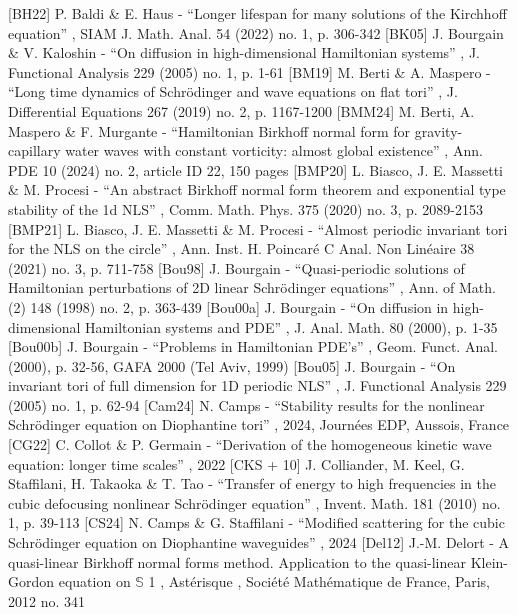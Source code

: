  [BH22] P. Baldi \& E. Haus - “Longer lifespan for many solutions of the Kirchhoff equation” , SIAM J. Math. Anal. 54 (2022) no. 1, p. 306-342
 [BK05] J. Bourgain \& V. Kaloshin - “On diffusion in high-dimensional Hamiltonian systems” , J. Functional Analysis 229 (2005) no. 1, p. 1-61
 [BM19] M. Berti \& A. Maspero - “Long time dynamics of Schrödinger and wave equations on flat tori” , J. Differential Equations 267 (2019) no. 2, p. 1167-1200
 [BMM24] M. Berti, A. Maspero \& F. Murgante - “Hamiltonian Birkhoff normal form for gravity-capillary water waves with constant vorticity: almost global existence” , Ann. PDE 10 (2024) no. 2, article ID 22, 150 pages
 [BMP20] L. Biasco, J. E. Massetti \& M. Procesi - “An abstract Birkhoff normal form theorem and exponential type stability of the 1d NLS” , Comm. Math. Phys. 375 (2020) no. 3, p. 2089-2153
 [BMP21] L. Biasco, J. E. Massetti \& M. Procesi - “Almost periodic invariant tori for the NLS on the circle” , Ann. Inst. H. Poincaré C Anal. Non Linéaire 38 (2021) no. 3, p. 711-758
 [Bou98] J. Bourgain - “Quasi-periodic solutions of Hamiltonian perturbations of 2D linear Schrödinger equations” , Ann. of Math. (2) 148 (1998) no. 2, p. 363-439
 [Bou00a] J. Bourgain - “On diffusion in high-dimensional Hamiltonian systems and PDE” , J. Anal. Math. 80 (2000), p. 1-35
 [Bou00b] J. Bourgain - “Problems in Hamiltonian PDE’s” , Geom. Funct. Anal. (2000), p. 32-56, GAFA 2000 (Tel Aviv, 1999)
 [Bou05] J. Bourgain - “On invariant tori of full dimension for 1D periodic NLS” , J. Functional Analysis 229 (2005) no. 1, p. 62-94
 [Cam24] N. Camps - “Stability results for the nonlinear Schrödinger equation on Diophantine tori” , 2024, Journées EDP, Aussois, France
 [CG22] C. Collot \& P. Germain - “Derivation of the homogeneous kinetic wave equation: longer time scales” , 2022
 [CKS + 10] J. Colliander, M. Keel, G. Staffilani, H. Takaoka \& T. Tao - “Transfer of energy to high frequencies in the cubic defocusing nonlinear Schrödinger equation” , Invent. Math. 181 (2010) no. 1, p. 39-113
 [CS24] N. Camps \& G. Staffilani - “Modified scattering for the cubic Schrödinger equation on Diophantine waveguides” , 2024
 [Del12] J.-M. Delort - A quasi-linear Birkhoff normal forms method. Application to the quasi-linear Klein-Gordon equation on $\mathbb{S}$ 1 , Astérisque , Société Mathématique de France, Paris, 2012 no. 341
